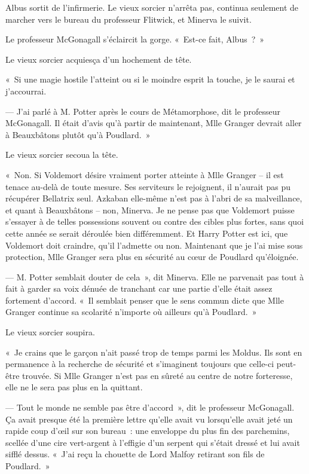 Albus sortit de l'infirmerie.
Le vieux sorcier n'arrêta pas, continua seulement de marcher vers le bureau du professeur Flitwick, et Minerva le suivit.

Le professeur McGonagall s'éclaircit la gorge.
«~Est-ce fait, Albus~?~»

Le vieux sorcier acquiesça d'un hochement de tête.

«~Si une magie hostile l'atteint ou si le moindre esprit la touche, je le saurai et j'accourrai.

--- J'ai parlé à M. Potter après le cours de Métamorphose, dit le professeur McGonagall.
Il était d'avis qu'à partir de maintenant, Mlle Granger devrait aller à Beauxbâtons plutôt qu'à Poudlard.~»

Le vieux sorcier secoua la tête.

«~Non. Si Voldemort désire vraiment porter atteinte à Mlle Granger -- il est tenace au-delà de toute mesure.
Ses serviteurs le rejoignent, il n'aurait pas pu récupérer Bellatrix seul.
Azkaban elle-même n'est pas à l'abri de sa malveillance, et quant à Beauxbâtons -- non, Minerva.
Je ne pense pas que Voldemort puisse s'essayer à de telles possessions souvent ou contre des cibles plus fortes, sans quoi cette année se serait déroulée bien différemment.
Et Harry Potter est ici, que Voldemort doit craindre, qu'il l'admette ou non.
Maintenant que je l'ai mise sous protection, Mlle Granger sera plus en sécurité au cœur de Poudlard qu'éloignée.

--- M. Potter semblait douter de cela~», dit Minerva.
Elle ne parvenait pas tout à fait à garder sa voix dénuée de tranchant car une partie d'elle était assez fortement d'accord.
«~Il semblait penser que le sens commun dicte que Mlle Granger continue sa scolarité n'importe où ailleurs qu'à Poudlard.~»

Le vieux sorcier soupira.

«~Je crains que le garçon n'ait passé trop de temps parmi les Moldus.
Ils sont en permanence à la recherche de sécurité et s'imaginent toujours que celle-ci peut-être trouvée.
Si Mlle Granger n'est pas en sûreté au centre de notre forteresse, elle ne le sera pas plus en la quittant.

--- Tout le monde ne semble pas être d'accord~», dit le professeur McGonagall.
Ça avait presque été la première lettre qu'elle avait vu lorsqu'elle avait jeté un rapide coup d'œil sur son bureau~: une enveloppe du plus fin des parchemins, scellée d'une cire vert-argent à l'effigie d'un serpent qui s'était dressé et lui avait sifflé dessus.
«~J'ai reçu la chouette de Lord Malfoy retirant son fils de Poudlard.~»

